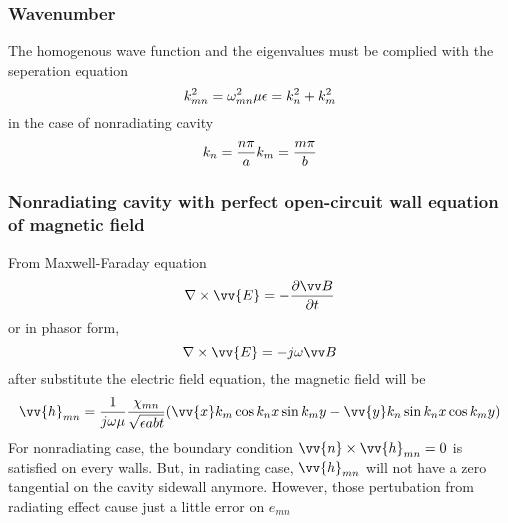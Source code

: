   \subsubsection{Wavenumber}
    \indent The homogenous wave function and the eigenvalues must be complied with the seperation equation
    \begin{equation}
      \label{kmn}
      k_{mn}^2 = \omega_{mn}^2\mu\epsilon = k_n^2 + k_m^2\\
    \end{equation}
    \indent in the case of nonradiating cavity
    \begin{equation}
      k_{n} = \frac{n\pi}{a}\\
      k_{m} = \frac{m\pi}{b}
    \end{equation}

  \subsubsection{Nonradiating cavity with perfect open-circuit wall equation of magnetic field}
    \indent From Maxwell-Faraday equation
    \begin{equation}
      \nabla \times \vv{E} = - \frac {\partial{\vv B}} {\partial t}
    \end{equation}
    \indent or in phasor form,
    \begin{equation}
      \nabla \times \vv{E} = -j\omega{\vv B}
    \end{equation}
    \indent after substitute the electric field equation, the magnetic field will be
    \begin{equation}
       \vv{h}_{mn} = \frac{1}{j\omega\mu}\frac{\chi_{mn}}{\sqrt{\epsilon abt}}(\vv{x}k_m\cos{k_nx}\sin{k_my} - \vv{y}k_n\sin{k_n}{x}\cos{k_m}{y})
    \end{equation}
    \indent For nonradiating case, the boundary condition $\vv{n} \times \vv{h}_{mn} = 0$ is satisfied on every walls.
            But, in radiating case, $\vv{h}_{mn}$ will not have a zero tangential on the cavity sidewall anymore.
            However, those pertubation from radiating effect cause just a little error on $e_{mn}$\cite{CaM:81}
  
